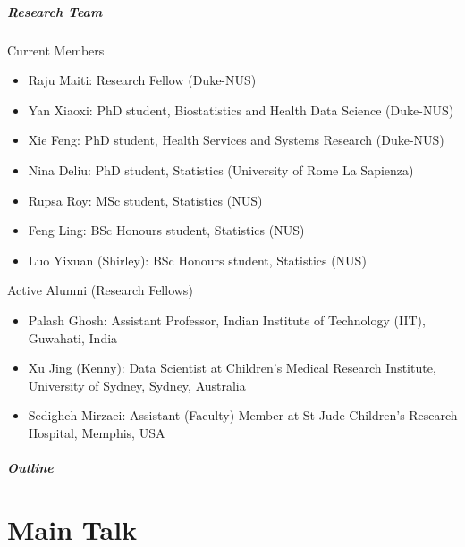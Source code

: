\documentclass[10pt,xcolor=dvipsnames]{beamer}
\begin{document}
\begin{frame} %
\frametitle{Research Team}
\alert{Current Members}
\bigskip
\begin{itemize}
\item {\color{blue}Raju Maiti:} Research Fellow (Duke-NUS)
\item {\color{blue}Yan Xiaoxi:} PhD student, Biostatistics and Health Data Science (Duke-NUS)
\item {\color{blue}Xie Feng:} PhD student, Health Services and Systems Research (Duke-NUS)
\item {\color{blue}Nina Deliu:} PhD student, Statistics (University of Rome La Sapienza)
\item {\color{blue}Rupsa Roy:} MSc student, Statistics (NUS)
\item {\color{blue}Feng Ling:} BSc Honours student, Statistics (NUS)
\item {\color{blue}Luo Yixuan (Shirley):} BSc Honours student, Statistics (NUS)
\end{itemize}
\bigskip
\alert{Active Alumni (Research Fellows)}
\begin{itemize}
\item {\color{blue}Palash Ghosh:} Assistant Professor, Indian Institute of Technology (IIT), Guwahati, India
\item {\color{blue}Xu Jing (Kenny):} Data Scientist at Children's Medical Research Institute, University of Sydney, Sydney, Australia 
\item {\color{blue}Sedigheh Mirzaei:} Assistant (Faculty) Member at St Jude Children's Research Hospital, Memphis, USA
\end{itemize}

\end{frame}



\begin{frame}%
  \frametitle{Outline}
  \tableofcontents[part=1]
\end{frame}


\part<presentation>{Main Talk}


\end{document}
